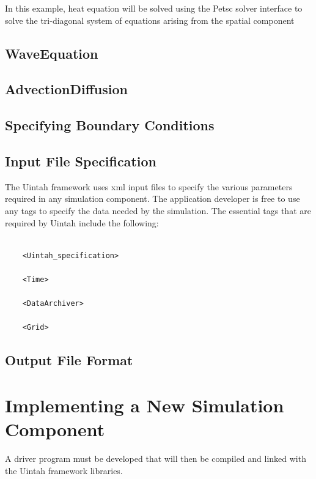 \documentclass[12pt]{report}
\begin{document}
In this example, heat equation will be solved using the Petsc solver
interface to solve the tri-diagonal system of equations arising from
the spatial component

\section{WaveEquation}

\section{AdvectionDiffusion}

\section{Specifying Boundary Conditions}

\section{Input File Specification}

The Uintah framework uses xml input files to specify the various
parameters required in any simulation component.  The application
developer is free to use any tags to specify the data needed by the
simulation.  The essential tags that are required by Uintah include
the following:

\begin{Verbatim}[fontsize=\footnotesize]

	<Uintah_specification>

	<Time>

	<DataArchiver>

	<Grid>

\end{Verbatim}

\section{Output File Format}



\chapter{Implementing a New Simulation Component}

A driver program must be developed that will then be compiled and
linked with the Uintah framework libraries.
\end{document}
